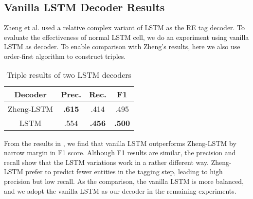 \subsection{Vanilla LSTM Decoder Results}
Zheng et al.  used a relative complex variant of LSTM as the RE tag
decoder. To evaluate the effectiveness of normal LSTM cell, we do an experiment
using vanilla LSTM as decoder. To enable comparison with Zheng's results, here
we also use order-first algorithm to construct triples.

\begin{table}[th!]
  \small
  \caption{Triple results of two LSTM decoders}
  \label{tab:decode}
  \begin{center}
    \begin{tabular}{c|ccc}
      \hline
      \bf Decoder & \bf Prec. & \bf Rec. & \bf F1 \\
      \hline
      Zheng-LSTM  & \textbf{.615} & .414 & .495 \\
      LSTM   & .554 & \textbf{.456} & \textbf{.500} \\
      \hline
    \end{tabular}
  \end{center}
\end{table}

From the results in ,
we find that vanilla LSTM outperforms Zheng-LSTM by narrow margin in F1 score.
Although F1 results are similar,
the precision and recall show that the LSTM variations work in a rather different way.
Zheng-LSTM prefer to predict fewer entities in the tagging step,
leading to high precision but low recall.
As the comparison, the vanilla LSTM is more balanced,
and we adopt the vanilla LSTM as our decoder in the remaining experiments.





